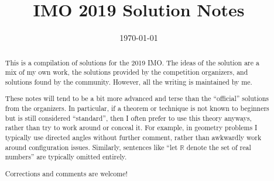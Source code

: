 \documentclass[11pt]{scrartcl}
\title{IMO 2019 Solution Notes}
\date{\today}
\begin{document}
\maketitle

\begin{abstract}
This is a compilation of solutions
for the 2019 IMO.
The ideas of the solution are a mix of my own work,
the solutions provided by the competition organizers,
and solutions found by the community.
However, all the writing is maintained by me.

These notes will tend to be a bit more advanced and terse than the ``official''
solutions from the organizers.
In particular, if a theorem or technique is not known to beginners
but is still considered ``standard'', then I often prefer to
use this theory anyways, rather than try to work around or conceal it.
For example, in geometry problems I typically use directed angles
without further comment, rather than awkwardly work around configuration issues.
Similarly, sentences like ``let $\mathbb{R}$ denote the set of real numbers''
are typically omitted entirely.

Corrections and comments are welcome!
\end{abstract}

\tableofcontents
\newpage

\addtocounter{section}{-1}
\end{document}
